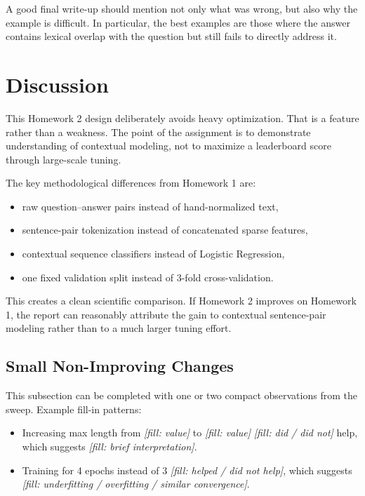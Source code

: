 \documentclass[12pt]{fphw}
\newcommand{\placeholder}[1]{\textit{[fill: #1]}}
\begin{document}
A good final write-up should mention not only what was wrong, but also why the example is difficult. In particular, the best examples are those where the answer contains lexical overlap with the question but still fails to directly address it.

\section{Discussion}

This Homework 2 design deliberately avoids heavy optimization. That is a feature rather than a weakness. The point of the assignment is to demonstrate understanding of contextual modeling, not to maximize a leaderboard score through large-scale tuning.

The key methodological differences from Homework 1 are:
\begin{itemize}
	\item raw question--answer pairs instead of hand-normalized text,
	\item sentence-pair tokenization instead of concatenated sparse features,
	\item contextual sequence classifiers instead of Logistic Regression,
	\item one fixed validation split instead of 3-fold cross-validation.
\end{itemize}

This creates a clean scientific comparison. If Homework 2 improves on Homework 1, the report can reasonably attribute the gain to contextual sentence-pair modeling rather than to a much larger tuning effort.

\subsection{Small Non-Improving Changes}

This subsection can be completed with one or two compact observations from the sweep. Example fill-in patterns:
\begin{itemize}
	\item Increasing max length from \placeholder{value} to \placeholder{value} \placeholder{did / did not} help, which suggests \placeholder{brief interpretation}.
	\item Training for 4 epochs instead of 3 \placeholder{helped / did not help}, which suggests \placeholder{underfitting / overfitting / similar convergence}.
\end{itemize}
\end{document}
